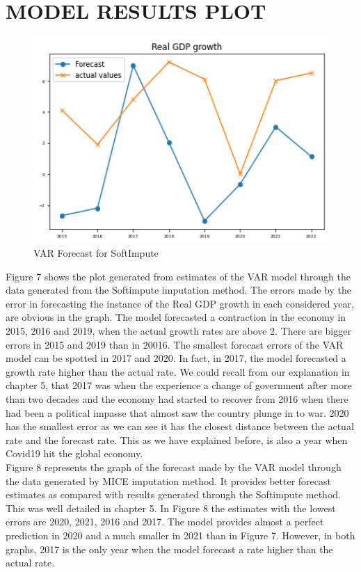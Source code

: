 \documentclass[12pt,italian, twoside]{report}
\begin{document}
\chapter{MODEL RESULTS PLOT}
	\begin{figure}[t]
	\centering
	\includegraphics[width = 130mm]{immagini/vfor.png}
	\caption{VAR Forecast for SoftImpute}
	\label{fig:var_forcast}
\end{figure}
Figure 7 shows the plot generated from estimates of the VAR model through the data generated from the Softimpute imputation method. The errors made by the error in forecasting the instance of the Real GDP growth in each considered year, are obvious in the graph. The model forecasted a contraction in the economy in 2015, 2016 and 2019, when the actual growth rates are above 2. There are bigger errors in 2015 and 2019 than in 20016. The smallest forecast errors of the VAR model can be spotted in 2017 and 2020. In fact, in 2017, the model forecasted a growth rate higher than the actual rate. We could recall from our explanation in chapter 5, that 2017 was when the experience a change of government after more than two decades and the economy had started to recover from 2016 when there had been a political impasse that almost saw the country plunge in to war. 2020 has the smallest error as we can see it has the closest distance between the actual rate and the forecast rate. This as we have explained before, is also a year when Covid19 hit the global economy.\\
Figure 8 represents the graph of the forecast made by the VAR model through the data generated by MICE imputation method. It provides better forecast estimates as compared with results generated through the Softimpute method. This was well detailed in chapter 5. In Figure 8 the estimates with the lowest errors are 2020, 2021, 2016 and 2017. The model provides almost a perfect prediction in 2020 and a much smaller in 2021 than in Figure 7. However, in both graphs, 2017 is the only year when the model forecast a rate higher than the actual rate.
\end{document}
